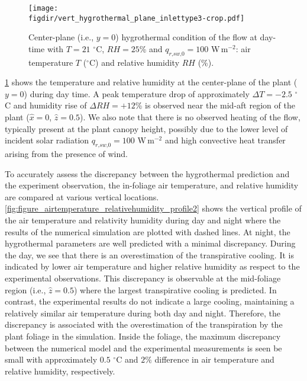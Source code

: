 \begin{figure}[t]
	\centering
	\texttt{[image: \\figdir/vert\_hygrothermal\_plane\_inlettype3-crop.pdf]}
	\caption{Center-plane (i.e., $y=0$) hygrothermal condition of the flow at day-time with $T = 21$ $^{\circ}$C, $\textit{RH}=25$\% and $q_{\textit{r,sw,0}} = 100$ W\,m$^{-2}$:  air temperature $T$ ($^{\circ}$C) and  relative humidity $\mathit{RH}$ (\%).}
	\label{fig:vert_hygrothermal_plane}
\end{figure}


\cref{fig:vert_hygrothermal_plane} shows the temperature and relative humidity at the center-plane of the plant ($y=0$) during day time. A peak temperature drop of approximately $\Delta T = -2.5$ $^{\circ}$C and humidity rise of $\Delta RH = +12$\% is observed near the mid-aft region of the plant ($\hat{x} = 0$, $\hat{z} = 0.5$). We also note that there is no observed heating of the flow, typically present at the plant canopy height, possibly due to the lower level of incident solar radiation $q_{\textit{r,sw,0}} = 100$ W\,m$^{-2}$ and high convective heat transfer arising from the presence of wind. 

To accurately assess the discrepancy between the hygrothermal prediction and the experiment observation, the in-foliage air temperature, and relative humidity are compared at various vertical locations. \cref{fig:figure_airtemperature_relativehumidity_profile2} shows the vertical profile of the air temperature and relativity humidity during day and night where the results of the numerical simulation are plotted with dashed lines. At night, the hygrothermal parameters are well predicted with a minimal discrepancy. During the day, we see that there is an overestimation of the transpirative cooling. It is indicated by lower air temperature and higher relative humidity as respect to the experimental observations. This discrepancy is observable at the mid-foliage region (i.e., $\hat{z} = 0.5$) where the largest transpirative cooling is predicted. In contrast, the experimental results do not indicate a large cooling, maintaining a relatively similar air temperature during both day and night. Therefore, the discrepancy is associated with the overestimation of the transpiration by the plant foliage in the simulation. Inside the foliage, the maximum discrepancy between the numerical model and the experimental measurements is seen be small with approximately $0.5$ $^{\circ}$C and $2\%$ difference in air temperature and relative humidity, respectively. 

